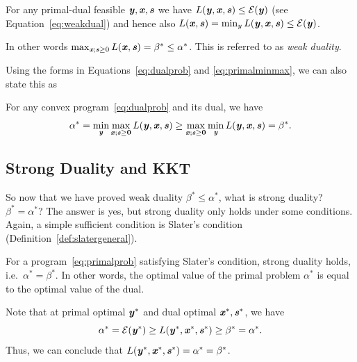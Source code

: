 

For any primal-dual feasible $\yy,\xx,\ss$ we have
$L(\yy, \xx, \ss) \leq \energy(\yy)$ (see Equation~\eqref{eq:weakdual}) and hence also $L(\xx, \ss) = \min_y L(\yy, \xx, \ss) \leq \energy(\yy)$.

In other words $\max_{\xx; \ss \geq 0} L(\xx, \ss) = \beta^* \leq \alpha^*$.
This is referred to as \emph{weak duality}.

Using the forms in Equations~\eqref{eq:dualprob} and
\eqref{eq:primalminmax}, we can also state this as
\begin{theorem}
  For any convex program~\eqref{eq:dualprob} and its dual, we have
  \begin{equation*}
  \alpha^* = \min_{\yy}\max_{\xx; \ss\geq\veczero} L(\yy, \xx, \ss)
  \geq
  \max_{\xx; \ss\geq\veczero} \min_{\yy} L(\yy, \xx, \ss)
  =
  \beta^*
  .
\end{equation*}
\end{theorem}


\subsection{Strong Duality and KKT}
So now that we have proved weak duality $\beta^* \leq \alpha^*$,
what is strong duality? $\beta^* = \alpha^*$?
The answer is yes, but strong duality only holds under some conditions.
Again, a simple sufficient condition is Slater's condition (Definition~\ref{def:slatergeneral}).

\begin{theorem}
  \label{thm:slaterstrongduality}
For a program~\eqref{eq:primalprob} satisfying Slater's condition, strong duality holds, i.e.\ $\alpha^* = \beta^*$.
In other words, the optimal value of the primal problem $\alpha^*$ is
equal to the optimal value of the dual.
\end{theorem}

Note that at primal optimal $\yy^*$ and dual optimal $\xx^*,
\ss^*$, we have
\[
  \alpha^* = \energy(\yy^*) \geq L(\yy^*, \xx^*, \ss^*)
  \geq \beta^* = \alpha^*
  .
\]
Thus, we can conclude that $L(\yy^*, \xx^*, \ss^*) = \alpha^* =
\beta^*$.


